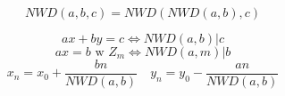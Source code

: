 \documentclass[a4paper,12pt]{article}
\begin{document}
\begin{multicols}{2}
    \[
        NWD\left(a, b, c\right) = NWD\left(NWD\left(a, b\right), c\right)
    \]

    \[
        ax + by = c \Leftrightarrow NWD\left(a, b\right) | c
    \]
    \[
        ax = b \text{ w } Z_m \Leftrightarrow NWD\left(a, m\right) | b
    \]
    \[ 
        x_n = x_0 + \frac{bn}{NWD\left( a, b \right)}\quad
        y_n = y_0 - \frac{an}{NWD\left( a, b \right)}
    \]







\end{multicols}
\end{document}
